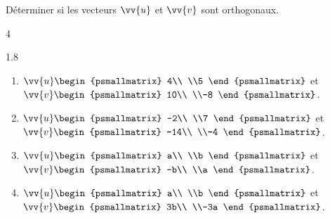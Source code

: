 \documentclass[main.tex]{subfiles}
\begin{document}
\begin{exercise} Déterminer si les vecteurs $\vv{u}$ et $\vv{v}$ sont orthogonaux.\vspace{-0.5em}
\begin{multicols}{4}
	\begin{spacing}{1.8}
		\begin{enumerate}[label=\arabic*),leftmargin=*]
			\item  $ \vv{u}
			\displaystyle\begin{psmallmatrix}
				4\\ \\5
			\end{psmallmatrix}$ et $\vv{v}\begin{psmallmatrix}
				10\\ \\-8
			\end{psmallmatrix}$. 
		\item  $ \vv{u}
		\displaystyle\begin{psmallmatrix}
			-2\\ \\7
		\end{psmallmatrix}$ et $\vv{v}\begin{psmallmatrix}
			-14\\ \\-4
		\end{psmallmatrix}$. 
	\item  $ \vv{u}
	\displaystyle\begin{psmallmatrix}
		a\\ \\b
	\end{psmallmatrix}$ et $\vv{v}\begin{psmallmatrix}
		-b\\ \\a
	\end{psmallmatrix}$. 
\item  $ \vv{u}
\displaystyle\begin{psmallmatrix}
	a\\ \\b
\end{psmallmatrix}$ et $\vv{v}\begin{psmallmatrix}
	3b\\ \\-3a
\end{psmallmatrix}$. 
		\end{enumerate}	
		\end{spacing}
	\end{multicols} 
\vspace{-0.5em}
\end{exercise}
\end{document}
